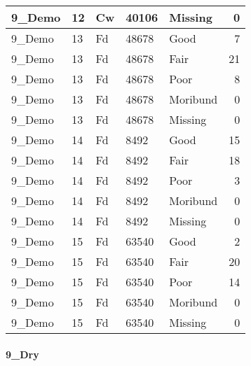 \documentclass[
]{article}
\begin{document}
\begin{tabular}{l|l|l|l|l|r}
\hline
9\_Demo & 12 & Cw & 40106 & Missing & 0\\
\hline
9\_Demo & 13 & Fd & 48678 & Good & 7\\
\hline
9\_Demo & 13 & Fd & 48678 & Fair & 21\\
\hline
9\_Demo & 13 & Fd & 48678 & Poor & 8\\
\hline
9\_Demo & 13 & Fd & 48678 & Moribund & 0\\
\hline
9\_Demo & 13 & Fd & 48678 & Missing & 0\\
\hline
9\_Demo & 14 & Fd & 8492 & Good & 15\\
\hline
9\_Demo & 14 & Fd & 8492 & Fair & 18\\
\hline
9\_Demo & 14 & Fd & 8492 & Poor & 3\\
\hline
9\_Demo & 14 & Fd & 8492 & Moribund & 0\\
\hline
9\_Demo & 14 & Fd & 8492 & Missing & 0\\
\hline
9\_Demo & 15 & Fd & 63540 & Good & 2\\
\hline
9\_Demo & 15 & Fd & 63540 & Fair & 20\\
\hline
9\_Demo & 15 & Fd & 63540 & Poor & 14\\
\hline
9\_Demo & 15 & Fd & 63540 & Moribund & 0\\
\hline
9\_Demo & 15 & Fd & 63540 & Missing & 0\\
\hline
\end{tabular}

\hypertarget{dry-1}{%
\paragraph{9\_Dry}\label{dry-1}}
\end{document}
